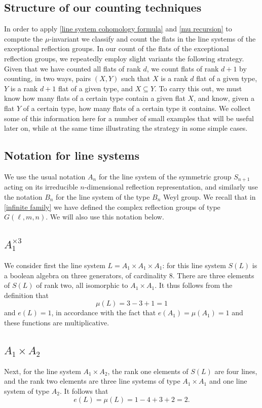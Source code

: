 \documentclass[11pt, reqno]{amsart}
\numberwithin{equation}{section}
\theoremstyle{definition}
\theoremstyle{plain}
\begin{document}
\subsection{Structure of our counting techniques} In order to apply \eqref{line system cohomology formula} and \eqref{mu recursion} to compute the $\mu$-invariant we classify and count the flats in the line systems of the exceptional reflection groups. In our count of the flats of the exceptional reflection groups, we repeatedly employ slight variants the following strategy. Given that we have counted all flats of rank $d$, we count flats of rank $d+1$ by counting, in two ways, pairs $(X,Y)$ such that $X$ is a rank $d$ flat of a given type, $Y$ is a rank $d+1$ flat of a given type, and $X \subseteq Y$. To carry this out, we must know how many flats of a certain type contain a given flat $X$, and know, given a flat $Y$ of a certain type, how many flats of a certain type it contains. We collect some of this information here for a number of small examples that will be useful later on, while at the same time illustrating the strategy in some simple cases.

\subsection{Notation for line systems} We use the usual notation $A_n$ for the line system of the symmetric group $S_{n+1}$ acting on its irreducible $n$-dimensional reflection representation, and similarly use the notation $B_n$ for the line system of the type $B_n$ Weyl group. We recall that in \ref{infinite family} we have defined the complex reflection groups of type $G(\ell,m,n)$. We will also use this notation below.

\subsection{$A_1^{\times 3}$} We consider first the line system $L=A_1 \times A_1 \times A_1$: for this line system $S(L)$ is a boolean algebra on three generators, of cardinality $8$. There are three elements of $S(L)$ of rank two, all isomorphic to $A_1 \times A_1$. It thus follows from the definition that
$$\mu(L)=3-3+1=1$$ and $e(L)=1$, in accordance with the fact that $e(A_1)=\mu(A_1)=1$ and these functions are multiplicative.

\subsection{$A_1 \times A_2$} Next, for the line system $A_1 \times A_2$, the rank one elements of $S(L)$ are four lines, and the rank two elements are three line systems of type $A_1 \times A_1$ and one line system of type $A_2$. It follows that
$$e(L)=\mu(L)=1-4+3+2=2.$$
\end{document}
